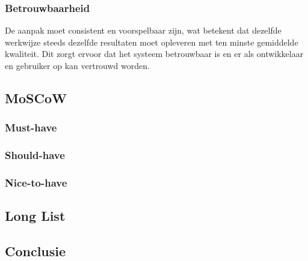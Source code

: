\subsubsection{Betrouwbaarheid}

De aanpak moet consistent en voorspelbaar zijn, wat betekent dat dezelfde werkwijze steeds dezelfde resultaten moet opleveren met ten minste gemiddelde kwaliteit. Dit zorgt ervoor dat het systeem betrouwbaar is en er als ontwikkelaar en gebruiker op kan vertrouwd worden.

\subsection{MoSCoW}



\subsubsection{Must-have}
\subsubsection{Should-have}
\subsubsection{Nice-to-have}

\subsection{Long List}


\subsection{Conclusie}